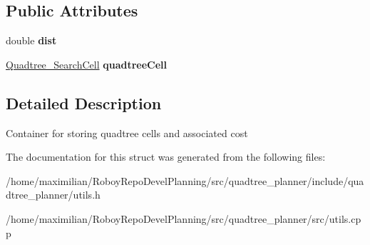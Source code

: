 \subsection*{Public Attributes}
\begin{DoxyCompactItemize}
\item 
\mbox{\label{structquadtree__planner_1_1QuadtreeCellWithDist_a640a4291ae6ee693a18377a8fe2e2081}} 
double {\bfseries dist}
\item 
\mbox{\label{structquadtree__planner_1_1QuadtreeCellWithDist_a3691048d0b7914d5a69932ce785b3a74}} 
\hyperlink{classQuadtree__SearchCell}{Quadtree\+\_\+\+Search\+Cell} {\bfseries quadtree\+Cell}
\end{DoxyCompactItemize}


\subsection{Detailed Description}
Container for storing quadtree cells and associated cost 

The documentation for this struct was generated from the following files\+:\begin{DoxyCompactItemize}
\item 
/home/maximilian/\+Roboy\+Repo\+Devel\+Planning/src/quadtree\+\_\+planner/include/quadtree\+\_\+planner/utils.\+h\item 
/home/maximilian/\+Roboy\+Repo\+Devel\+Planning/src/quadtree\+\_\+planner/src/utils.\+cpp\end{DoxyCompactItemize}
